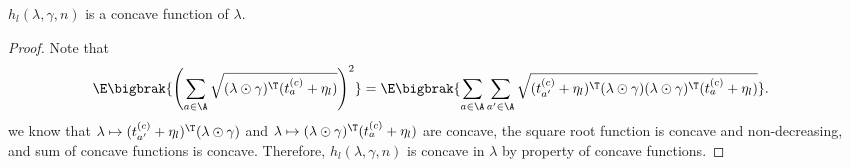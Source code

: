 \documentclass{article}
\newcommand{\1}{\mathbf{1}}
\begin{document}
\begin{lemma}\label{lem:concave}
$h_l(\lambda,\gamma,n)$ is a concave function of $\lambda$.
\end{lemma}
\begin{proof}
Note that 
\begin{align*}
    \E\bigbrak{\left(\sum_{a\in\A} \sqrt{(\lambda\odot\gamma)^\T (t_a^{(c)}+\eta_l)}\right)^2}&=\E\bigbrak{\sum_{a\in\A}\sum_{a'\in\A}\sqrt{(t_{a'}^{(c)}+\eta_l)^\T(\lambda\odot\gamma)(\lambda\odot\gamma)^\T (t_a^{(c)}+\eta_l)}}.
\end{align*}
we know that $\lambda\mapsto (t_{a'}^{(c)}+\eta_l)^\T(\lambda\odot\gamma)$ and $\lambda\mapsto (\lambda\odot\gamma)^\T (t_a^{(c)}+\eta_l)$ are concave, the square root function is concave and non-decreasing, and sum of concave functions is concave. Therefore, $h_l(\lambda,\gamma,n)$ is concave in $\lambda$ by property of concave functions. 
\end{proof}
\end{document}
